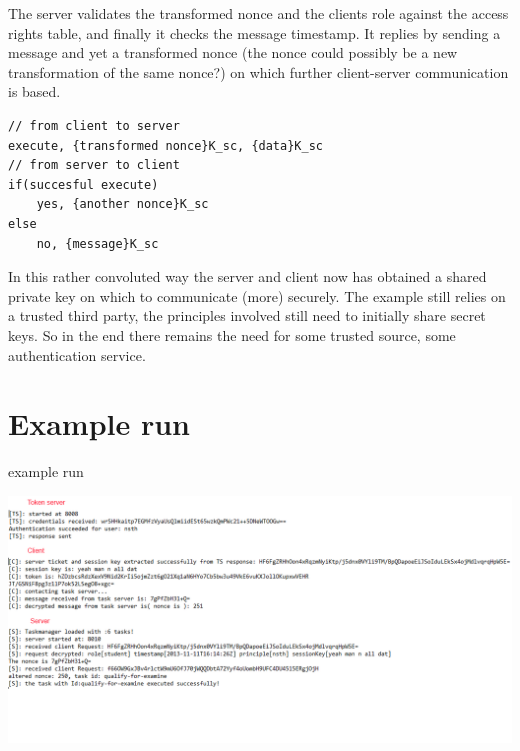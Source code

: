 The server validates the transformed nonce and the clients role against the access rights table, and finally it checks the message timestamp. It replies by sending a message and yet a transformed nonce (the nonce could possibly be a new transformation of the same nonce?) on which further client-server communication is based.


\begin{lstlisting}
// from client to server
execute, {transformed nonce}K_sc, {data}K_sc
// from server to client
if(succesful execute)
	yes, {another nonce}K_sc
else
	no, {message}K_sc
\end{lstlisting}

In this rather convoluted way the server and client now has obtained a shared private key on which to communicate (more) securely. The example still relies on a trusted third party, the principles involved still need to initially share secret keys. So in the end there remains the need for some trusted source, some authentication service. \\
 

\section{Example run}

\begin{center}
\centering
\caption{example run}
\includegraphics[scale=0.5]{images/security_run.png}
\end{center}
\vspace{10pt}


